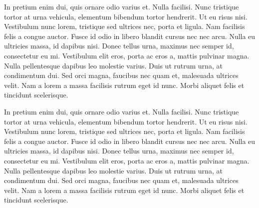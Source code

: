 \documentclass{report}
\begin{document}
	In pretium enim dui, quis ornare odio varius et. Nulla facilisi. Nunc tristique tortor at urna vehicula, elementum bibendum tortor hendrerit. Ut eu risus nisi. Vestibulum nunc lorem, tristique sed ultrices nec, porta et ligula. Nam facilisis felis a congue auctor. Fusce id odio in libero blandit cursus nec nec arcu. Nulla eu ultricies massa, id dapibus nisi. Donec tellus urna, maximus nec semper id, consectetur eu mi. Vestibulum elit eros, porta ac eros a, mattis pulvinar magna. Nulla pellentesque dapibus leo molestie varius. Duis ut rutrum urna, at condimentum dui. Sed orci magna, faucibus nec quam et, malesuada ultrices velit. Nam a lorem a massa facilisis rutrum eget id nunc. Morbi aliquet felis et tincidunt scelerisque.

	In pretium enim dui, quis ornare odio varius et. Nulla facilisi. Nunc tristique tortor at urna vehicula, elementum bibendum tortor hendrerit. Ut eu risus nisi. Vestibulum nunc lorem, tristique sed ultrices nec, porta et ligula. Nam facilisis felis a congue auctor. Fusce id odio in libero blandit cursus nec nec arcu. Nulla eu ultricies massa, id dapibus nisi. Donec tellus urna, maximus nec semper id, consectetur eu mi. Vestibulum elit eros, porta ac eros a, mattis pulvinar magna. Nulla pellentesque dapibus leo molestie varius. Duis ut rutrum urna, at condimentum dui. Sed orci magna, faucibus nec quam et, malesuada ultrices velit. Nam a lorem a massa facilisis rutrum eget id nunc. Morbi aliquet felis et tincidunt scelerisque.
\end{document}
